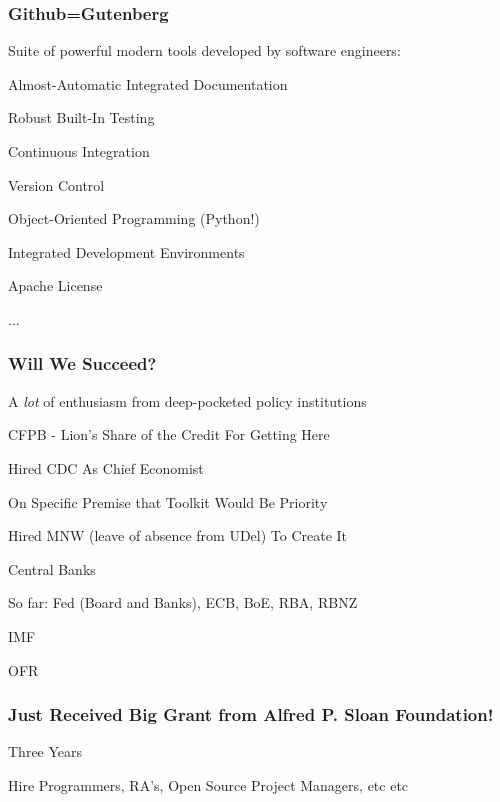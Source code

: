 \documentclass[public]{beamer}
\begin{document}
\begin{frame}\frametitle{Github=Gutenberg}
\pause Suite of powerful modern tools developed by software engineers: \pause    
    \bi
  \item Almost-Automatic Integrated Documentation
  \item Robust Built-In Testing 
  \item Continuous Integration
  \item Version Control
  \item Object-Oriented Programming (Python!)
  \item Integrated Development Environments
  \item Apache License 
  \item ...
    \ei
    \medskip

  \end{frame}

  

\begin{frame}\frametitle{Will We Succeed?}  
\pause A {\it lot} of enthusiasm from deep-pocketed policy institutions     \pause

\bi \item CFPB - Lion's Share of the Credit For Getting Here
  \bi
\item Hired CDC As Chief Economist
  \bi
  \item On Specific Premise that Toolkit Would Be Priority
    \ei
    \item Hired MNW (leave of absence from UDel) To Create It 
  \ei
  \ei
  
    \bi
  \item Central Banks
    \bi \item So far: Fed (Board and Banks), ECB, BoE, RBA, RBNZ
    \ei 
  \item IMF
  \item OFR
    \ei
    
\end{frame}

\begin{frame}\frametitle{Just Received Big Grant from Alfred P. Sloan Foundation!}  

  Three Years \pause
  \bi
  \item Hire Programmers, RA's, Open Source Project Managers, etc etc
  \ei
  
\end{frame}
\end{document}
